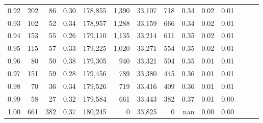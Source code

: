 \begin{tabular}{rrrrrrrrrrrrrr}
0.92 &    202 &   86 &  0.30 &  178,855 &    1,390 &  33,107 &     718 &  0.34 &  0.02 &      0.01 \\
0.93 &    102 &   52 &  0.34 &  178,957 &    1,288 &  33,159 &     666 &  0.34 &  0.02 &      0.01 \\
0.94 &    153 &   55 &  0.26 &  179,110 &    1,135 &  33,214 &     611 &  0.35 &  0.02 &      0.01 \\
0.95 &    115 &   57 &  0.33 &  179,225 &    1,020 &  33,271 &     554 &  0.35 &  0.02 &      0.01 \\
0.96 &     80 &   50 &  0.38 &  179,305 &      940 &  33,321 &     504 &  0.35 &  0.01 &      0.01 \\
0.97 &    151 &   59 &  0.28 &  179,456 &      789 &  33,380 &     445 &  0.36 &  0.01 &      0.01 \\
0.98 &     70 &   36 &  0.34 &  179,526 &      719 &  33,416 &     409 &  0.36 &  0.01 &      0.01 \\
0.99 &     58 &   27 &  0.32 &  179,584 &      661 &  33,443 &     382 &  0.37 &  0.01 &      0.00 \\
1.00 &    661 &  382 &  0.37 &  180,245 &        0 &  33,825 &       0 &   nan &  0.00 &      0.00 \\
\bottomrule
\end{tabular}
